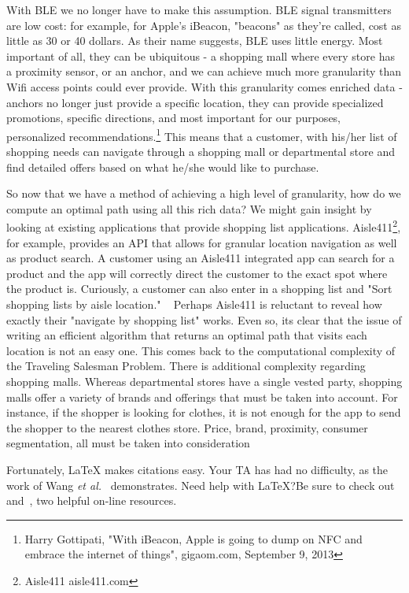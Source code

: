 \documentclass{sig-alternate}
\begin{document}
With BLE we no longer have to make this assumption. BLE signal 
transmitters are low cost: for example, for Apple's iBeacon, "beacons"
as they're called, cost as little as 30 or 40 dollars.  As their name
suggests, BLE uses little energy. Most important of all, they can be
ubiquitous - a shopping mall where every store has a proximity
sensor, or an anchor, and we can achieve much more granularity
than Wifi access points could ever provide. With this granularity 
comes enriched data - anchors no longer just provide a specific 
location, they can provide specialized promotions, specific 
directions, and most important for our purposes, personalized 
recommendations.\footnote{Harry Gottipati, "With iBeacon, Apple is 
going to dump on NFC and embrace the internet of things", 
gigaom.com, September 9, 2013}
This means that a customer, with his/her list of shopping needs
can navigate through a shopping mall or departmental store and
find detailed offers based on what he/she would like to purchase.

So now that we have a method of achieving a high level of 
granularity, how do we compute an optimal path using all this
rich data? We might gain insight by looking at existing applications
that provide shopping list applications. 
Aisle411\footnote{Aisle411 aisle411.com}, for example, provides 
an API that allows for granular location navigation as well as product 
search. A customer using an Aisle411 integrated app can search for 
a product and the app will correctly direct the customer to the exact 
spot where the product is. Curiously, a customer can also enter in a 
shopping list and "Sort shopping lists by aisle location." ~\cite{aisle411}
Perhaps Aisle411 is reluctant to reveal how exactly their "navigate by 
shopping list" works. Even so, its clear that the issue of writing an 
efficient algorithm that returns an optimal path that visits each location 
is not an easy one. This comes back to the computational complexity
of the Traveling Salesman Problem.
There is additional complexity regarding shopping malls. Whereas 
departmental stores have a single vested party, shopping malls offer
a variety of brands and offerings that must be taken into account. For
instance, if the shopper is looking for clothes, it is not enough for the
app to send the shopper to the nearest clothes store. Price, brand, 
proximity, consumer segmentation, all must be taken into consideration

Fortunately, \LaTeX{} makes citations easy. Your TA has had no 
difficulty, as the work of Wang \textit{et al.}~\cite{wang13} 
demonstrates. Need help with \LaTeX{}?Be sure to check 
out~\cite{latex_wikibook} and~\cite{ctan_pdf}, two
helpful on-line resources.
\end{document}
